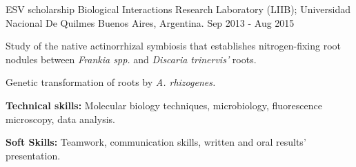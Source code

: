 \begin{cventries}
 \cventry
    {ESV scholarship} %
    {Biological Interactions Research Laboratory (LIIB); Universidad Nacional De Quilmes} %
    {Buenos Aires, Argentina.} %
    {Sep 2013 - Aug 2015} %
    {
      \begin{cvitems} %
        \item {Study of the native actinorrhizal symbiosis that establishes nitrogen-fixing root nodules between \textit{Frankia spp.} and \textit{Discaria trinervis'} roots.}
        \item{Genetic transformation of roots by \textit{A. rhizogenes.}}
        \item {\textbf{Technical skills:} Molecular biology techniques, microbiology,  fluorescence microscopy, data analysis.}
        \item {\textbf{Soft Skills:} Teamwork, communication skills, written and oral results' presentation.}
      \end{cvitems}
    }
\end{cventries}

